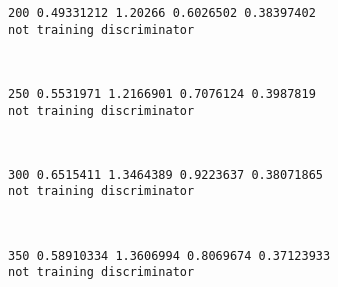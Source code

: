 \documentclass[11pt]{article}
\begin{document}
    \begin{Verbatim}[commandchars=\\\{\}]
200 0.49331212 1.20266 0.6026502 0.38397402
not training discriminator

    \end{Verbatim}

    \begin{center}
    \end{center}
    { \hspace*{\fill} \\}
    
    \begin{Verbatim}[commandchars=\\\{\}]
250 0.5531971 1.2166901 0.7076124 0.3987819
not training discriminator

    \end{Verbatim}

    \begin{center}
    \end{center}
    { \hspace*{\fill} \\}
    
    \begin{Verbatim}[commandchars=\\\{\}]
300 0.6515411 1.3464389 0.9223637 0.38071865
not training discriminator

    \end{Verbatim}

    \begin{center}
    \end{center}
    { \hspace*{\fill} \\}
    
    \begin{Verbatim}[commandchars=\\\{\}]
350 0.58910334 1.3606994 0.8069674 0.37123933
not training discriminator

    \end{Verbatim}

    \begin{center}
    \end{center}
    { \hspace*{\fill} \\}
    
\end{document}
